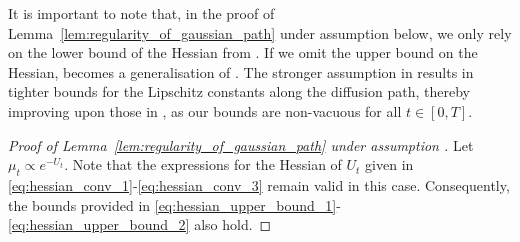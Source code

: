 It is important to note that, in the proof of Lemma~\ref{lem:regularity_of_gaussian_path} under assumption  below, we only rely on the lower bound of the Hessian from . If we omit the upper bound on the Hessian,   becomes a generalisation of . The stronger assumption in  results in tighter bounds for the Lipschitz constants along the diffusion path, thereby improving upon those in \citet{gao2024gaussian}, as our bounds are non-vacuous for all $t\in[0, T]$.

\begin{proof}[Proof of Lemma~\ref{lem:regularity_of_gaussian_path} under assumption ]
Let $\mu_t\propto e^{-U_t}$. 
Note that the expressions for the Hessian of $U_t$ given in \eqref{eq:hessian_conv_1}-\eqref{eq:hessian_conv_3} remain valid in this case. Consequently, the bounds provided in \eqref{eq:hessian_upper_bound_1}-\eqref{eq:hessian_upper_bound_2} also hold.


\end{proof}

